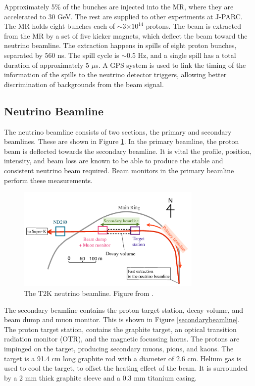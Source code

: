 Approximately 5$\%$ of the bunches are injected into the MR, where they are accelerated to 30 GeV. The rest are supplied to other experiments at J-PARC. The MR holds eight bunches each of $\sim$3$\times10^{14}$ protons. The beam is extracted from the MR by a set of five kicker magnets, which deflect the beam toward the neutrino beamline. The extraction happens in spills of eight proton bunches, separated by 560 ns. The spill cycle is $\sim$0.5 Hz, and a single spill has a total duration of approximately 5 $\mu$s. A GPS system is used to link the timing of the information of the spills to the neutrino detector triggers, allowing better discrimination of backgrounds from the beam signal.

\subsection{Neutrino Beamline}

The neutrino beamline consists of two sections, the primary and secondary beamlines. These are shown in Figure \ref{beamline}. In the primary beamline, the proton beam is deflected towards the secondary beamline. It is vital the profile, position, intensity, and beam loss are known to be able to produce the stable and consistent neutrino beam required. Beam monitors in the primary beamline perform these measurements. 

\begin{figure}[!htbp]
\centering
\includegraphics*[width=0.8\textwidth,clip]{figs/beamline}
\caption{The T2K neutrino beamline. Figure from \cite{decayhorns}.} \label{beamline}
\end{figure}

The secondary beamline contains the proton target station, decay volume, and beam dump and muon monitor. This is shown in Figure \ref{secondarybeamline}. The proton target station, contains the graphite target, an optical transition radiation monitor (OTR), and the magnetic focussing horns. The protons are impinged on the target, producing secondary muons, pions, and kaons. The target is a 91.4 cm long graphite rod with a diameter of 2.6 cm. Helium gas is used to cool the target, to offset the heating effect of the beam. It is surrounded by a 2 mm thick graphite sleeve and a 0.3 mm titanium casing. 

